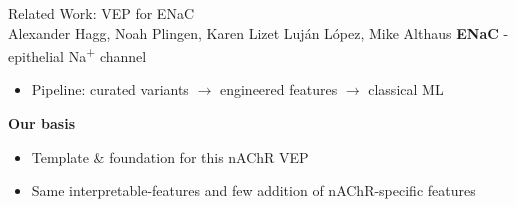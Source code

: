 \documentclass[aspectratio=169]{beamer}
\begin{document}
\begin{frame}{Related Work: VEP for ENaC 
  \\ Alexander Hagg, Noah Plingen, Karen Lizet Luján López, Mike Althaus}
\textbf{ENaC} - epithelial Na\textsuperscript{+} channel
\begin{itemize}\setlength\itemsep{0.5em}
  
  \item Pipeline: curated variants $\rightarrow$ engineered features
        $\rightarrow$ classical ML
\end{itemize}
\medskip
\textbf{Our basis}
\begin{itemize}\setlength\itemsep{0.5em}
  \item Template \& foundation for this nAChR VEP
  \item Same interpretable-features and few addition of nAChR-specific features
\end{itemize}
\end{frame}
\end{document}
